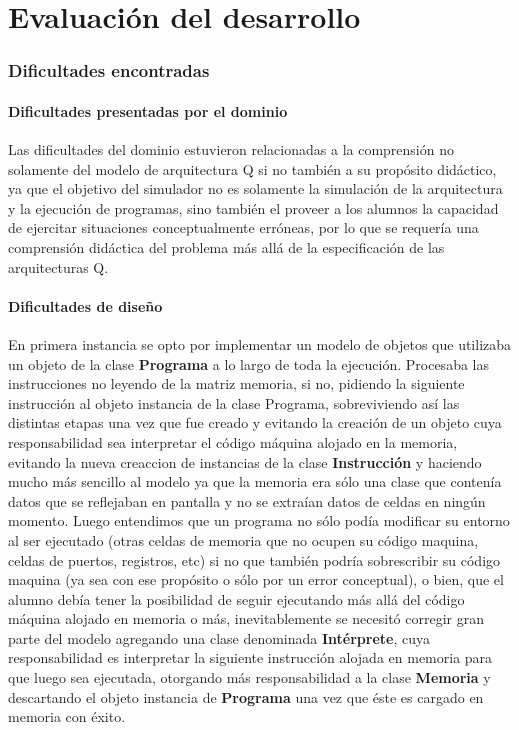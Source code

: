 \part{Evaluación del desarrollo}

\section{Dificultades encontradas}

\subsection{Dificultades presentadas por el dominio}
Las dificultades del dominio estuvieron relacionadas a la comprensión no solamente del modelo de arquitectura Q si no también a su propósito didáctico, ya que el objetivo del simulador no es solamente la simulación de la arquitectura y la ejecución de programas, sino también el proveer a los alumnos la capacidad de ejercitar situaciones conceptualmente erróneas, por lo que se requería una comprensión didáctica del problema más allá de la especificación de las arquitecturas Q. 

\subsection{Dificultades de diseño}
En primera instancia se opto por implementar un modelo de objetos que utilizaba un objeto de la clase \textbf{Programa} a lo largo de toda la ejecución. Procesaba las instrucciones no leyendo de la matriz memoria, si no, pidiendo la siguiente instrucción al objeto instancia de la clase Programa, sobreviviendo así las distintas etapas una vez que fue creado y evitando la creación de un objeto cuya responsabilidad sea interpretar el código máquina alojado en la memoria, evitando la nueva creaccion de instancias de la clase \textbf{Instrucción} y haciendo mucho más sencillo al modelo ya que la memoria era sólo una clase que contenía datos que se reflejaban en pantalla y no se extraían datos de celdas en ningún momento. Luego entendimos que un programa no sólo podía modificar su entorno al ser ejecutado (otras celdas de memoria que no ocupen su código maquina, celdas de puertos, registros, etc) si no que también podría sobrescribir su código maquina (ya sea con ese propósito o sólo por un error conceptual), o bien, que el alumno debía tener la posibilidad de seguir ejecutando más allá del código máquina alojado en memoria o más, inevitablemente se necesitó corregir gran parte del modelo agregando una clase denominada \textbf{Intérprete}, cuya responsabilidad es interpretar la siguiente instrucción alojada en memoria para que luego sea ejecutada, otorgando más responsabilidad a la clase \textbf{Memoria} y descartando el objeto instancia de \textbf{Programa} una vez que éste es cargado en memoria con éxito.\\


